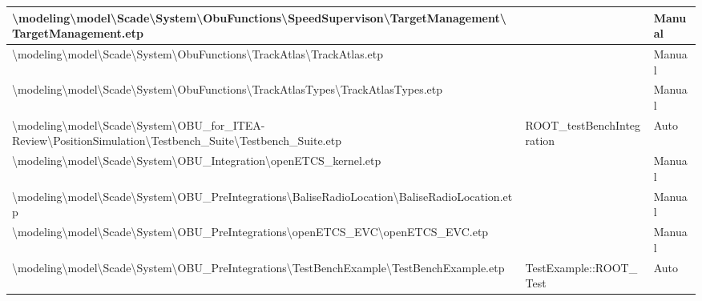 \begin{longtable}{|>{\RaggedRight}p{}|>{\RaggedRight}p{}|>{\RaggedRight}p{}|}
\hline
\textbackslash \allowbreak modeling\textbackslash \allowbreak model\textbackslash \allowbreak Scade\textbackslash \allowbreak System\textbackslash \allowbreak ObuFunctions\textbackslash \allowbreak SpeedSupervison\textbackslash \allowbreak TargetManagement\textbackslash \allowbreak TargetManagement.etp& &Manual\\
\hline
\textbackslash \allowbreak modeling\textbackslash \allowbreak model\textbackslash \allowbreak Scade\textbackslash \allowbreak System\textbackslash \allowbreak ObuFunctions\textbackslash \allowbreak TrackAtlas\textbackslash \allowbreak TrackAtlas.etp& &Manual\\
\hline
\textbackslash \allowbreak modeling\textbackslash \allowbreak model\textbackslash \allowbreak Scade\textbackslash \allowbreak System\textbackslash \allowbreak ObuFunctions\textbackslash \allowbreak TrackAtlasTypes\textbackslash \allowbreak TrackAtlasTypes.etp& &Manual\\
\hline
\textbackslash \allowbreak modeling\textbackslash \allowbreak model\textbackslash \allowbreak Scade\textbackslash \allowbreak System\textbackslash \allowbreak OBU\_\allowbreak for\_\allowbreak ITEA-Review\textbackslash \allowbreak PositionSimulation\textbackslash \allowbreak Testbench\_\allowbreak Suite\textbackslash \allowbreak Testbench\_\allowbreak Suite.etp&ROOT\_\allowbreak testBenchIntegration&Auto\\
\hline
\textbackslash \allowbreak modeling\textbackslash \allowbreak model\textbackslash \allowbreak Scade\textbackslash \allowbreak System\textbackslash \allowbreak OBU\_\allowbreak Integration\textbackslash \allowbreak openETCS\_\allowbreak kernel.etp& &Manual\\
\hline
\textbackslash \allowbreak modeling\textbackslash \allowbreak model\textbackslash \allowbreak Scade\textbackslash \allowbreak System\textbackslash \allowbreak OBU\_\allowbreak PreIntegrations\textbackslash \allowbreak BaliseRadioLocation\textbackslash \allowbreak BaliseRadioLocation.etp& &Manual\\
\hline
\textbackslash \allowbreak modeling\textbackslash \allowbreak model\textbackslash \allowbreak Scade\textbackslash \allowbreak System\textbackslash \allowbreak OBU\_\allowbreak PreIntegrations\textbackslash \allowbreak openETCS\_\allowbreak EVC\textbackslash \allowbreak openETCS\_\allowbreak EVC.etp& &Manual\\
\hline
\textbackslash \allowbreak modeling\textbackslash \allowbreak model\textbackslash \allowbreak Scade\textbackslash \allowbreak System\textbackslash \allowbreak OBU\_\allowbreak PreIntegrations\textbackslash \allowbreak TestBenchExample\textbackslash \allowbreak TestBenchExample.etp&TestExample::ROOT\_\allowbreak Test&Auto\\

\end{longtable}
